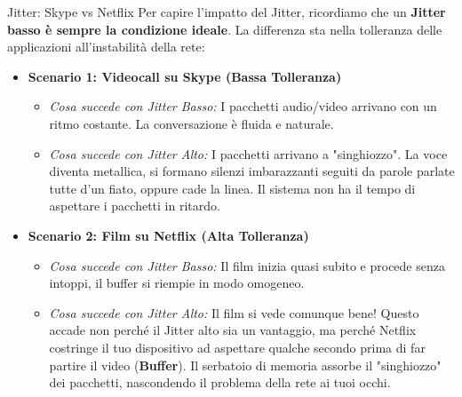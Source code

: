 \documentclass[a4paper,12pt]{report}
\begin{document}
\begin{esempiobox}{Jitter: Skype vs Netflix}
Per capire l'impatto del Jitter, ricordiamo che un \textbf{Jitter basso è sempre la condizione ideale}. La differenza sta nella tolleranza delle applicazioni all'instabilità della rete:

\begin{itemize}
    \item \textbf{Scenario 1: Videocall su Skype (Bassa Tolleranza)}
    \begin{itemize}
        \item \textit{Cosa succede con Jitter Basso:} I pacchetti audio/video arrivano con un ritmo costante. La conversazione è fluida e naturale.
        \item \textit{Cosa succede con Jitter Alto:} I pacchetti arrivano a "singhiozzo". La voce diventa metallica, si formano silenzi imbarazzanti seguiti da parole parlate tutte d'un fiato, oppure cade la linea. Il sistema non ha il tempo di aspettare i pacchetti in ritardo.
    \end{itemize}
    
    \vspace{0.3cm}
    
    \item \textbf{Scenario 2: Film su Netflix (Alta Tolleranza)}
    \begin{itemize}
        \item \textit{Cosa succede con Jitter Basso:} Il film inizia quasi subito e procede senza intoppi, il buffer si riempie in modo omogeneo.
        \item \textit{Cosa succede con Jitter Alto:} Il film si vede comunque bene! Questo accade non perché il Jitter alto sia un vantaggio, ma perché Netflix costringe il tuo dispositivo ad aspettare qualche secondo prima di far partire il video (\textbf{Buffer}). Il serbatoio di memoria assorbe il "singhiozzo" dei pacchetti, nascondendo il problema della rete ai tuoi occhi.
    \end{itemize}
\end{itemize}
\end{esempiobox}



\newpage
\end{document}
